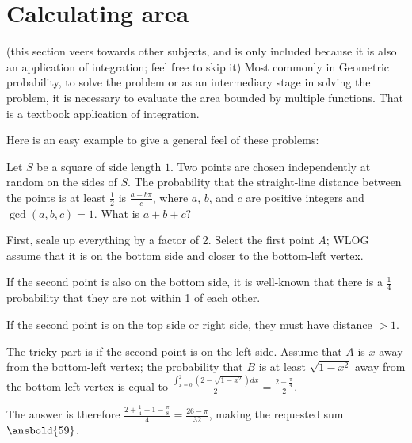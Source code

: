 \documentclass[mast]{lucky}
\begin{document}
\section{Calculating area}
(this section veers towards other subjects, and is only included because it is also an application of integration; feel free to skip it)
Most commonly in Geometric probability, to solve the problem or as an intermediary stage in solving the problem, it is necessary to evaluate the area bounded by multiple functions. That is a textbook application of integration.

Here is an easy example to give a general feel of these problems:
\begin{exam}[AMC 10A 2015/25]
Let $S$ be a square of side length $1$. Two points are chosen independently at random on the sides of $S$. The probability that the straight-line distance between the points is at least $\tfrac12$ is $\tfrac{a-b\pi}c$, where $a$, $b$, and $c$ are positive integers and $\gcd(a,b,c)=1$. What is $a+b+c$?
\end{exam}
\begin{sol}
First, scale up everything by a factor of 2. Select the first point $A$; WLOG assume that it is on the bottom side and closer to the bottom-left vertex.

If the second point is also on the bottom side, it is well-known that there is a $\frac{1}{4}$ probability that they are not within 1 of each other.

If the second point is on the top side or right side, they must have distance $>1$.

The tricky part is if the second point is on the left side. Assume that $A$ is $x$ away from the bottom-left vertex; the probability that $B$ is at least $\sqrt{1-x^2}$ away from the bottom-left vertex is equal to $\frac{\int_{x=0}^{2}(2-\sqrt{1-x^2})dx}{2}=\frac{2-\frac{\pi}{4}}{2}$.

The answer is therefore $\frac{2+\frac{1}{4}+1-\frac{\pi}{8}}{4}=\frac{26-\pi}{32}$, making the requested sum $\ansbold{59}$.
\end{sol}
\end{document}
